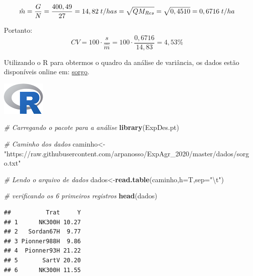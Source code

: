 \documentclass[
]{book}
\newenvironment{Shaded}{\begin{snugshade}}{\end{snugshade}}
\newcommand{\CharTok}[1]{\textcolor[rgb]{0.31,0.60,0.02}{#1}}
\newcommand{\CommentTok}[1]{\textcolor[rgb]{0.56,0.35,0.01}{\textit{#1}}}
\newcommand{\DataTypeTok}[1]{\textcolor[rgb]{0.13,0.29,0.53}{#1}}
\newcommand{\FloatTok}[1]{\textcolor[rgb]{0.00,0.00,0.81}{#1}}
\newcommand{\KeywordTok}[1]{\textcolor[rgb]{0.13,0.29,0.53}{\textbf{#1}}}
\newcommand{\NormalTok}[1]{#1}
\newcommand{\OperatorTok}[1]{\textcolor[rgb]{0.81,0.36,0.00}{\textbf{#1}}}
\newcommand{\StringTok}[1]{\textcolor[rgb]{0.31,0.60,0.02}{#1}}
\begin{document}
\[
\hat{m} = \frac{G}{N} = \frac{400,49}{27} = 14,82\;t/ha \\
s = \sqrt{QM_{Res}}=\sqrt{0,4510}=0,6716\;t/ha\\
\]

Portanto:
\[
CV=100\cdot \frac{s}{\hat{m}} = 100\cdot \frac{0,6716}{14,83}=4,53\%
\]

Utilizando o R para obtermos o quadro da análise de variância, os dados estão disponíveis online em:
\href{https://raw.githubusercontent.com/arpanosso/ExpAgr_2020/master/dados/sorgo.txt}{sorgo}.

\includegraphics{Rlogo.png}

\begin{Shaded}
\begin{Highlighting}[]
\CommentTok{# Carregando o pacote para a análise}
\KeywordTok{library}\NormalTok{(ExpDes.pt)}

\CommentTok{# Caminho dos dados}
\NormalTok{caminho<-}\StringTok{"https://raw.githubusercontent.com/arpanosso/ExpAgr_2020/master/dados/sorgo.txt"}

\CommentTok{# Lendo o arquivo de dados}
\NormalTok{dados<-}\KeywordTok{read.table}\NormalTok{(caminho,}\DataTypeTok{h=}\NormalTok{T,}\DataTypeTok{sep=}\StringTok{"}\CharTok{\textbackslash{}t}\StringTok{"}\NormalTok{)}

\CommentTok{# verificando os 6 primeiros registros}
\KeywordTok{head}\NormalTok{(dados)}
\end{Highlighting}
\end{Shaded}

\begin{verbatim}
##          Trat     Y
## 1      NK300H 10.27
## 2   Sordan67H  9.77
## 3 Pionner988H  9.86
## 4  Pionner93H 21.22
## 5       SartV 20.20
## 6      NK300H 11.55
\end{verbatim}

\begin{Shaded}
\end{Shaded}
\end{document}
